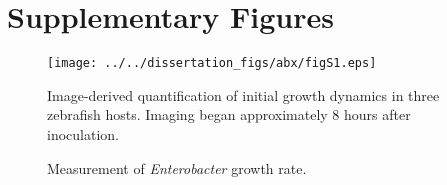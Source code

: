 %
%
\renewcommand\thefigure{\arabic{chapter}.S\arabic{figure}}    


\setcounter{figure}{0}

\section{Supplementary Figures}
\begin{figure}[H]
	\centerline{
		\texttt{[image: ../../dissertation\_figs/abx/figS1.eps]}}
	\caption{Measurement of \textit{Enterobacter} growth rate.}{Image-derived quantification of initial growth dynamics in three zebrafish hosts. Imaging began approximately 8 hours after inoculation.}
\end{figure}



